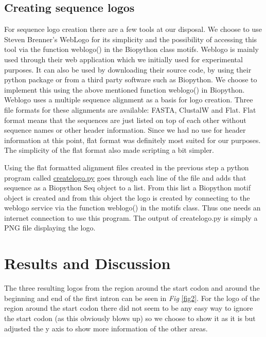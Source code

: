 \documentclass[10pt,letterpaper]{article}
\begin{document}
\subsection*{Creating sequence logos}
For sequence logo creation there are a few tools at our disposal. We choose to use Steven Brenner's WebLogo \cite{bib6} for its simplicity and the possibility of accessing this tool via the function weblogo() in the Biopython class motifs. Weblogo is mainly used through their web application which we initially used for experimental purposes. It can also be used by downloading their source code, by using their python package or from a third party software such as Biopython. We choose to implement this using the above mentioned function weblogo() in Biopython. Weblogo uses a multiple sequence alignment as a basis for logo creation. Three file formats for these alignments are available: FASTA, ClustalW and Flat. Flat format means that the sequences are just listed on top of each other without sequence names or other header information. Since we had no use for header information at this point, flat format was definitely most suited for our purposes. The simplicity of the flat format also made scripting a bit simpler.

Using the flat formatted alignment files created in the previous step a python program called \href{https://github.com/jolo2486/unravel_motifs/blob/master/bin/createlogo.py}{createlogo.py} goes through each line of the file and adds that sequence as a Biopython Seq object to a list. From this list a Biopython motif object is created and from this object the logo is created by connecting to the weblogo service via the function weblogo() in the motifs class. Thus one needs an internet connection to use this program. The output of createlogo.py is simply a PNG file displaying the logo.

\section*{Results and Discussion}
The three resulting logos from the region around the start codon and around the beginning and end of the first intron can be seen in \textit{Fig} \ref{fig2}. For the logo of the region around the start codon there did not seem to be any easy way to ignore the start codon (as this obviously blows up) so we choose to show it as it is but adjusted the y axis to show more information of the other areas.
\end{document}
